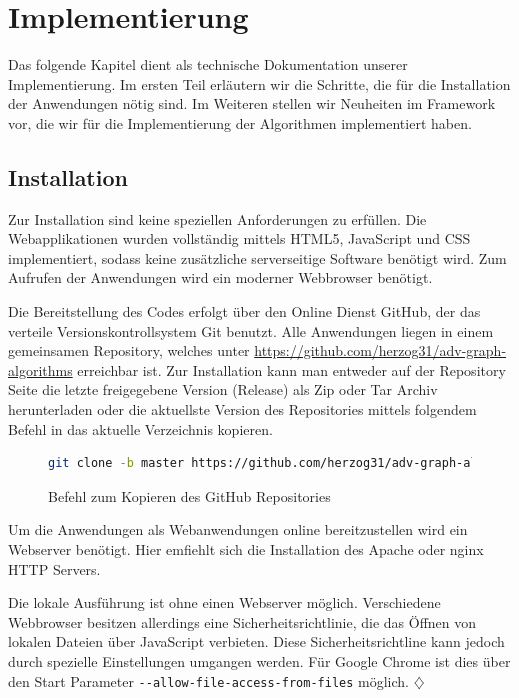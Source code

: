 \chapter{Implementierung}
Das folgende Kapitel dient als technische Dokumentation unserer Implementierung. Im ersten Teil erläutern wir die Schritte, die für die Installation der Anwendungen nötig sind. Im Weiteren stellen wir Neuheiten im Framework vor, die wir für die Implementierung der Algorithmen implementiert haben.

\section{Installation} %
Zur Installation sind keine speziellen Anforderungen zu erfüllen. Die Webapplikationen wurden vollständig mittels HTML5, JavaScript und CSS implementiert, sodass keine zusätzliche serverseitige Software benötigt wird. Zum Aufrufen der Anwendungen wird ein moderner Webbrowser benötigt.

Die Bereitstellung des Codes erfolgt über den Online Dienst GitHub, der das verteile Versionskontrollsystem Git benutzt. 
Alle Anwendungen liegen in einem gemeinsamen Repository, welches unter \url{https://github.com/herzog31/adv-graph-algorithms} erreichbar ist. Zur Installation kann man entweder auf der Repository Seite die letzte freigegebene Version (Release) als Zip oder Tar Archiv herunterladen oder die aktuellste Version des Repositories mittels folgendem Befehl in das aktuelle Verzeichnis kopieren.

\begin{figure}[h!]
\begin{lstlisting}[language=Bash]
git clone -b master https://github.com/herzog31/adv-graph-algorithms.git
\end{lstlisting}
\caption[Installation: Repository kopieren]{Befehl zum Kopieren des GitHub Repositories}\label{fig:listing-github}
\end{figure}

Um die Anwendungen als Webanwendungen online bereitzustellen wird ein Webserver benötigt. Hier emfiehlt sich die Installation des Apache oder nginx  HTTP Servers.

Die lokale Ausführung ist ohne einen Webserver möglich. Verschiedene Webbrowser besitzen allerdings eine Sicherheitsrichtlinie, die das Öffnen von lokalen Dateien über JavaScript verbieten. Diese Sicherheitsrichtline kann jedoch durch spezielle Einstellungen umgangen werden. Für Google Chrome ist dies über den Start Parameter \texttt{-{}-allow-file-access-from-files} möglich. \hfill$\diamondsuit$


